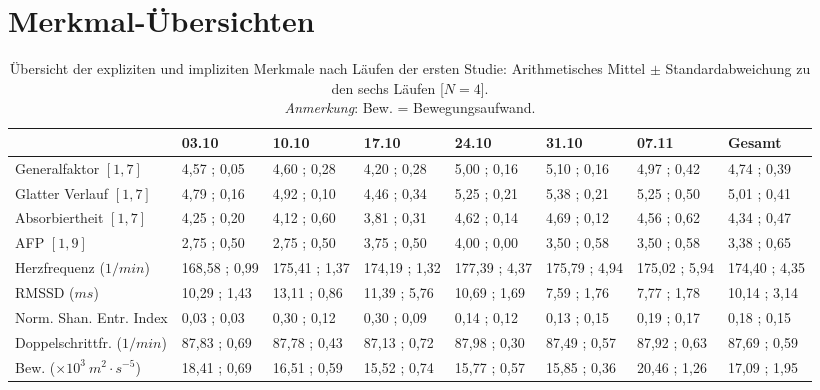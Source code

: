 \cleardoublepage

\section{Merkmal-Übersichten} 

\label{sec:merkmal_ubersichten} 
\begin{sidewaystable}
	\centering \caption[Übersicht der expliziten und impliziten Merkmale nach Läufen der ersten Studie.]{Übersicht der expliziten und impliziten Merkmale nach Läufen der ersten Studie: Arithmetisches Mittel $\pm$ Standardabweichung zu den sechs Läufen [$N = 4$]. \\
	\hspace{ 
	\textwidth}\emph{Anmerkung}: Bew. = Bewegungsaufwand.} \label{tab:ubersicht_nach_laufen_1} 
	\begin{tabular}
		{lyyyyyyy} \toprule & 03.10 & 10.10 & 17.10 & 24.10 & 31.10 & 07.11 & Gesamt \\
		\midrule Generalfaktor $[1{,} 7]$ & 4{,}57 ; 0{,}05 & 4{,}60 ; 0{,}28 & 4{,}20 ; 0{,}28 & 5{,}00 ; 0{,}16 & 5{,}10 ; 0{,}16 & 4{,}97 ; 0{,}42 & 4{,}74 ; 0{,}39 \\
		Glatter Verlauf $[1{,} 7]$ & 4{,}79 ; 0{,}16 & 4{,}92 ; 0{,}10 & 4{,}46 ; 0{,}34 & 5{,}25 ; 0{,}21 & 5{,}38 ; 0{,}21 & 5{,}25 ; 0{,}50 & 5{,}01 ; 0{,}41 \\
		Absorbiertheit $[1{,} 7]$ & 4{,}25 ; 0{,}20 & 4{,}12 ; 0{,}60 & 3{,}81 ; 0{,}31 & 4{,}62 ; 0{,}14 & 4{,}69 ; 0{,}12 & 4{,}56 ; 0{,}62 & 4{,}34 ; 0{,}47 \\
		\ac{AFP} $[1{,} 9]$ & 2{,}75 ; 0{,}50 & 2{,}75 ; 0{,}50 & 3{,}75 ; 0{,}50 & 4{,}00 ; 0{,}00 & 3{,}50 ; 0{,}58 & 3{,}50 ; 0{,}58 & 3{,}38 ; 0{,}65 \\
		Herzfrequenz ($1/min$) & 168{,}58 ; 0{,}99 & 175{,}41 ; 1{,}37 & 174{,}19 ; 1{,}32 & 177{,}39 ; 4{,}37 & 175{,}79 ; 4{,}94 & 175{,}02 ; 5{,}94 & 174{,}40 ; 4{,}35 \\
		\acs{RMSSD} ($ms$) & 10{,}29 ; 1{,}43 & 13{,}11 ; 0{,}86 & 11{,}39 ; 5{,}76 & 10{,}69 ; 1{,}69 & 7{,}59 ; 1{,}76 & 7{,}77 ; 1{,}78 & 10{,}14 ; 3{,}14 \\
		Norm. Shan. Entr. Index & 0{,}03 ; 0{,}03 & 0{,}30 ; 0{,}12 & 0{,}30 ; 0{,}09 & 0{,}14 ; 0{,}12 & 0{,}13 ; 0{,}15 & 0{,}19 ; 0{,}17 & 0{,}18 ; 0{,}15 \\
		Doppelschrittfr. ($1/min$) & 87,83 ; 0,69 & 87,78 ; 0,43 & 87,13 ; 0,72 & 87,98 ; 0,30 & 87,49 ; 0,57 & 87,92 ; 0,63 & 87,69 ; 0,59 \\
		Bew. ($\times 10^3 \: m^2 \cdot s^{-5}$) & 18{,}41 ; 0{,}69 & 16{,}51 ; 0{,}59 & 15{,}52 ; 0{,}74 & 15{,}77 ; 0{,}57 & 15{,}85 ; 0{,}36 & 20{,}46 ; 1{,}26 & 17{,}09 ; 1{,}95 \\
		\bottomrule 
	\end{tabular}
\end{sidewaystable}
